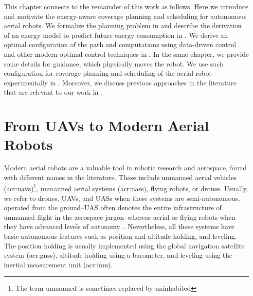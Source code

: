 This chapter connects to the remainder of this work as follows. Here we introduce and motivate the energy-aware coverage planning and scheduling for autonomous aerial robots. We formalize the planning problem in  and describe the derivation of an energy model to predict future energy consumption in . We derive an optimal configuration of the path and computations using data-driven control and other modern optimal control techniques in . In the same chapter, we provide some details for guidance, which physically moves the robot. We use such configuration for coverage planning and scheduling of the aerial robot experimentally in . Moreover, we discuss previous approaches in the literature that are relevant to our work in . 


\section{From UAVs to Modern Aerial Robots}
\label{sec:history}

Modern aerial robots are a valuable tool in robotic research and aerospace, found with different names in the literature. These include unmanned aerial vehicles (\Gls{acr:uav}s)\footnote{The term unmanned is sometimes replaced by uninhabited}, unmanned aerial systems (\Gls{acr:uas}s), flying robots, or drones. Usually, we refer to drones, UAVs, and UASs when these systems are semi-autonomous, operated from the ground--UAS often denotes the entire infrastructure of unmanned flight in the aerospace jargon--whereas aerial or flying robots when they have advanced levels of autonomy~\citep{siciliano2016springer}. Nevertheless, all these systems have basic autonomous features such as position and altitude holding, and leveling. The position holding is usually implemented using the global navigation satellite system (\Gls{acr:gnss}), altitude holding using a barometer, and leveling using the inertial measurement unit (\Gls{acr:imu}).

